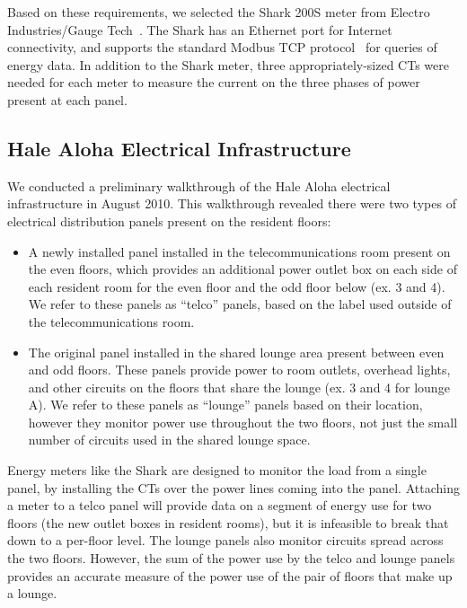 Based on these requirements, we selected the Shark 200S meter from Electro Industries/Gauge Tech~\cite{shark-200s}. The Shark has an Ethernet port for Internet connectivity, and supports the standard Modbus TCP protocol~\cite{modbus-website} for queries of energy data. In addition to the Shark meter, three appropriately-sized CTs were needed for each meter to measure the current on the three phases of power present at each panel.


\subsection{Hale Aloha Electrical Infrastructure}
\label{sec:electrical-infrastructure}

We conducted a preliminary walkthrough of the Hale Aloha electrical infrastructure in August 2010. This walkthrough revealed there were two types of electrical distribution panels present on the resident floors:

\begin{itemize}
	\item A newly installed panel installed in the telecommunications room present on the even floors, which provides an additional power outlet box on each side of each resident room for the even floor and the odd floor below (ex. 3 and 4). We refer to these panels as ``telco'' panels, based on the label used outside of the telecommunications room.
  \item The original panel installed in the shared lounge area present between even and odd floors. These panels provide power to room outlets, overhead lights, and other circuits on the floors that share the lounge (ex. 3 and 4 for lounge A). We refer to these panels as ``lounge'' panels based on their location, however they monitor power use throughout the two floors, not just the small number of circuits used in the shared lounge space.
\end{itemize}

Energy meters like the Shark are designed to monitor the load from a single panel, by installing the CTs over the power lines coming into the panel. Attaching a meter to a telco panel will provide data on a segment of energy use for two floors (the new outlet boxes in resident rooms), but it is infeasible to break that down to a per-floor level. The lounge panels also monitor circuits spread across the two floors. However, the sum of the power use by the telco and lounge panels provides an accurate measure of the power use of the pair of floors that make up a lounge.



